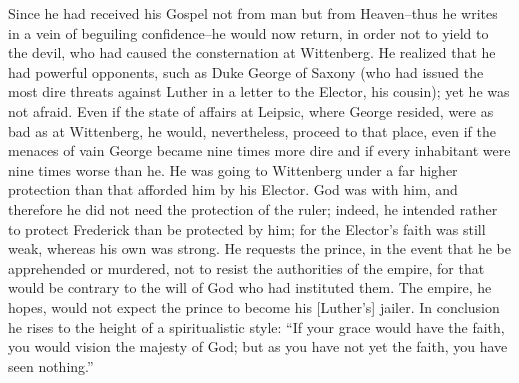 Since he had received his Gospel not from man but from Heaven--thus he
writes in a vein of beguiling confidence--he would now return, in order
not to yield to the devil, who had caused the consternation at Wittenberg.
He realized that he had powerful opponents, such as Duke George of Saxony
(who had issued the most dire threats against Luther in a letter to the
Elector, his cousin); yet he was not afraid. Even if the state of affairs at
Leipsic, where George resided, were as bad as at Wittenberg, he would,
nevertheless, proceed to that place, even if the menaces of vain George became
nine times more dire and if every inhabitant were nine times worse than he.
He was going to Wittenberg under a far higher protection than that afforded
him by his Elector. God was with him, and therefore he did not need the
protection of the ruler; indeed, he intended rather to protect Frederick than
be protected by him; for the Elector’s faith was still weak, whereas his
own was strong. He requests the prince, in the event that he be apprehended
or murdered, not to resist the authorities of the empire, for that would be
contrary to the will of God who had instituted them. The empire, he hopes,
would not expect the prince to become his [Luther’s] jailer. In conclusion
he rises to the height of a spiritualistic style: “If your grace would have the
faith, you would vision the majesty of God; but as you have not yet the
faith, you have seen nothing.”


